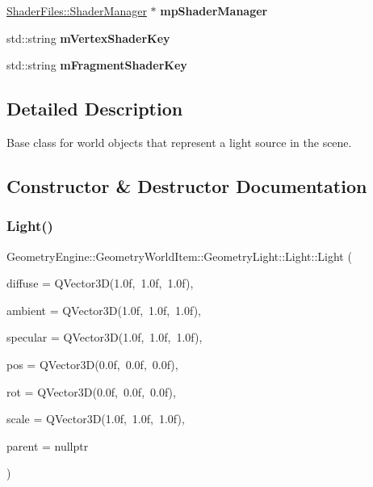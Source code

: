 \begin{DoxyCompactItemize}
\mbox{\hyperlink{class_shader_files_1_1_shader_manager}{Shader\+Files\+::\+Shader\+Manager}} $\ast$ {\bfseries mp\+Shader\+Manager}
\item 
\mbox{\label{class_geometry_engine_1_1_geometry_world_item_1_1_geometry_light_1_1_light_a0ccc9ec1473e73f9fa99ee82f9dd3fde}} 
std\+::string {\bfseries m\+Vertex\+Shader\+Key}
\item 
\mbox{\label{class_geometry_engine_1_1_geometry_world_item_1_1_geometry_light_1_1_light_a89bb65d39f7d64db038f04a543ea3cf5}} 
std\+::string {\bfseries m\+Fragment\+Shader\+Key}
\end{DoxyCompactItemize}


\subsection{Detailed Description}
Base class for world objects that represent a light source in the scene. 

\subsection{Constructor \& Destructor Documentation}
\mbox{\label{class_geometry_engine_1_1_geometry_world_item_1_1_geometry_light_1_1_light_a9dcea4ccc13220212d25379a52dd82b2}} 
\subsubsection{\texorpdfstring{Light()}{Light()}}
{\footnotesize\ttfamily Geometry\+Engine\+::\+Geometry\+World\+Item\+::\+Geometry\+Light\+::\+Light\+::\+Light (\begin{DoxyParamCaption}\item[{const Q\+Vector3D \&}]{diffuse = {\ttfamily QVector3D(1.0f,~1.0f,~1.0f)},  }\item[{const Q\+Vector3D \&}]{ambient = {\ttfamily QVector3D(1.0f,~1.0f,~1.0f)},  }\item[{const Q\+Vector3D \&}]{specular = {\ttfamily QVector3D(1.0f,~1.0f,~1.0f)},  }\item[{const Q\+Vector3D \&}]{pos = {\ttfamily QVector3D(0.0f,~0.0f,~0.0f)},  }\item[{const Q\+Vector3D \&}]{rot = {\ttfamily QVector3D(0.0f,~0.0f,~0.0f)},  }\item[{const Q\+Vector3D \&}]{scale = {\ttfamily QVector3D(1.0f,~1.0f,~1.0f)},  }\item[{\mbox{\hyperlink{class_geometry_engine_1_1_geometry_world_item_1_1_world_item}{World\+Item}} $\ast$}]{parent = {\ttfamily nullptr} }\end{DoxyParamCaption})}

